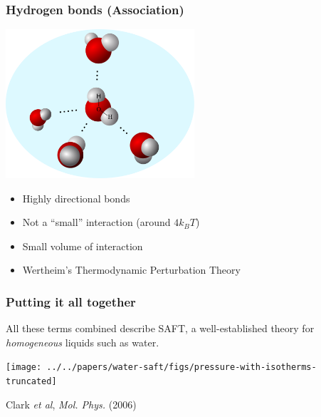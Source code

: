 \begin{frame}
  \frametitle{Hydrogen bonds (Association)}
  \vspace{-2em}
  \hfill\includegraphics[width=7cm]{figs/hydrogen-bonds}\hspace{-3em}
  \vspace{-2em}
  \begin{itemize}
  \item Highly directional bonds
  \item Not a ``small'' interaction (around $4k_BT$)
  \item Small volume of interaction
  \item Wertheim's Thermodynamic Perturbation Theory\\ \hfill
  \end{itemize}
\end{frame}

\begin{frame}
  \frametitle{Putting it all together}
  All these terms combined describe SAFT, a well-established theory
  for \emph{homogeneous} liquids such as water.
  \begin{center}
    \vspace{-1em}
    \texttt{[image: ../../papers/water-saft/figs/pressure-with-isotherms-truncated]}
  \end{center}
  \hfill Clark \emph{et al}, \emph{Mol. Phys.}
  (2006)
\end{frame}

